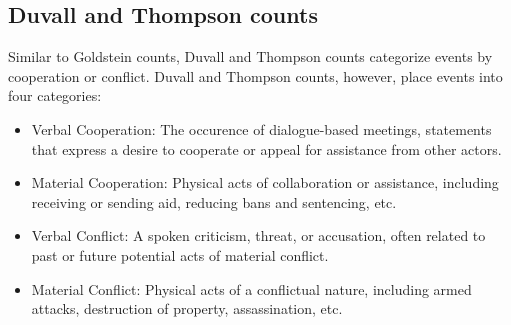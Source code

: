\documentclass[11pt]{article}
\begin{document}
\subsection{Duvall and Thompson counts}
\label{sec-3-4}
   Similar to Goldstein counts, Duvall and Thompson counts categorize events by cooperation or conflict. 
Duvall and Thompson counts, however, place events into four categories:
\begin{itemize}
\item Verbal Cooperation: The occurence of dialogue-based meetings, statements that 
express a desire to cooperate or appeal for assistance from other actors.
\item Material Cooperation: Physical acts of collaboration or assistance, including 
receiving or sending aid, reducing bans and sentencing, etc.
\item Verbal Conflict: A spoken criticism, threat, or accusation, often related to 
past or future potential acts of material conflict.
\item Material Conflict: Physical acts of a conflictual nature, including armed 
attacks, destruction of property, assassination, etc.
\end{itemize}
\end{document}
